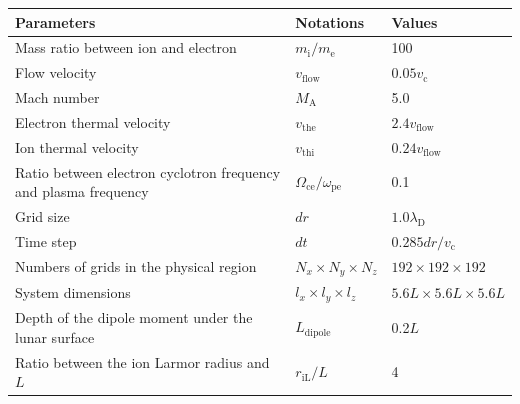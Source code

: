 \documentclass[draft,jgrga]{agutex2015}
\begin{document}
\begin{article}
\begin{table}[h]
\begin{tabular}{p{}ll}
 Parameters    &  Notations    &  Values \\  \hline           
 Mass ratio between ion and electron & $m_\mathrm{i}/m_\mathrm{e}$    & 100 \\
 Flow velocity                       & $v_\mathrm{flow} $  &  $0.05v_\mathrm{c}$ \\
 Mach number                         & $M_\mathrm{A}$ & 5.0 \\
 Electron thermal velocity           & $v_\mathrm{the}$ &  $2.4v_\mathrm{flow}$ \\
 Ion thermal velocity                & $v_\mathrm{thi}$ &  $ 0.24v_\mathrm{flow}$ \\
 Ratio between electron cyclotron frequency and plasma frequency & 
  $\Omega_\mathrm{ce}/\omega_\mathrm{pe}$ & 0.1 \\  \hline

 Grid size                          &   $dr$  & $1.0\lambda_\mathrm{D}$  \\
 Time step                          &   $dt$  &  $0.285dr/v_\mathrm{c}$  \\
 Numbers of grids in the physical region  &  
 $N_x \times N_y \times N_z$        &  $192 \times 192 \times 192$  \\
 System dimensions                 &   
$l_x \times l_y \times l_z$ & $ 5.6L \times 5.6L \times 5.6L$  \\
 Depth of the dipole moment under the lunar surface  &   $L_\mathrm{dipole}$ 
 &  0.2$L$ \\  
 Ratio between the ion Larmor radius and $L$ & $ r_\mathrm{iL}/L$  & 4 \\ \hline
 \end{tabular}
\end{table}



\end{article}
\end{document}

